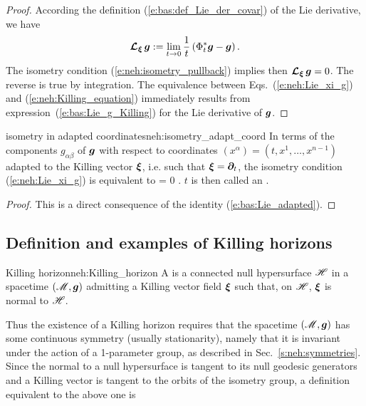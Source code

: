 \begin{proof}
According the definition (\ref{e:bas:def_Lie_der_covar}) of the Lie
derivative, we have
\[
    \bm{\mathcal{L}}_{\bm{\xi}}\, \bm{g} := \lim_{t \rightarrow 0} \frac{1}{t}
    \left( \Phi_t^*\bm{g} - \bm{g} \right) .
\]
The isometry condition
(\ref{e:neh:isometry_pullback}) implies then
$\bm{\mathcal{L}}_{\bm{\xi}}\,\bm{g} = 0$. The reverse is true by integration.
The equivalence between Eqs.~(\ref{e:neh:Lie_xi_g})
and (\ref{e:neh:Killing_equation}) immediately results from
expression~(\ref{e:bas:Lie_g_Killing}) for the Lie derivative of
$\bm{g}$.
\end{proof}

\begin{tprop}{isometry in adapted coordinates}{neh:isometry_adapt_coord}
In terms of the components $g_{\alpha\beta}$ of $\bm{g}$ with respect to
coordinates $(x^\alpha) = (t,x^1,\ldots,x^{n-1})$ adapted to the Killing vector $\bm{\xi}$,
i.e. such that $\bm{\xi} = \bm{\partial}_t$, the isometry condition (\ref{e:neh:Lie_xi_g})
is equivalent to
\be \label{e:neh:dgabdt_zero}
     = 0 .
\ee
$t$ is then called an .
\end{tprop}

\begin{proof}
This is a direct consequence of the identity (\ref{e:bas:Lie_adapted}).
\end{proof}


\subsection{Definition and examples of Killing horizons} \label{s:neh:def_Killing_hor}

\begin{tdef}{Killing horizon}{neh:Killing_horizon}
A  is
a connected null hypersurface $\mathscr{H}$ in a spacetime $(\mathscr{M},\bm{g})$ admitting a
Killing vector field $\bm{\xi}$ such that, on $\mathscr{H}$, $\bm{\xi}$ is
normal to $\mathscr{H}$.
\end{tdef}

Thus the existence of a Killing horizon requires that the spacetime $(\mathscr{M},\bm{g})$ has
some continuous symmetry
(usually stationarity), namely that it is invariant under the action of a
1-parameter group, as described in Sec.~\ref{s:neh:symmetries}.
Since the normal to a null hypersurface is tangent to its null geodesic
generators and a Killing vector is tangent to the orbits of the isometry group,
a definition equivalent to the above one is

